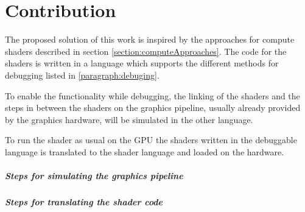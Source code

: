 

\chapter{Contribution}\label{cha:Contribution}

The proposed solution of this work is inspired by the approaches for compute shaders described in section \ref{section:computeApproaches}. The code for the shaders is written in a language which supports the different methods for debugging listed in \ref{paragraph:debuging}.

To enable the functionality while debugging, the linking of the shaders and the steps in between the shaders on the graphics pipeline, usually already provided by the graphics hardware, will be simulated in the other language.

To run the shader as usual on the GPU the shaders written in the debuggable language is translated to the shader language and loaded on the hardware.

\paragraph{Steps for simulating the graphics pipeline}

\paragraph{Steps for translating the shader code}